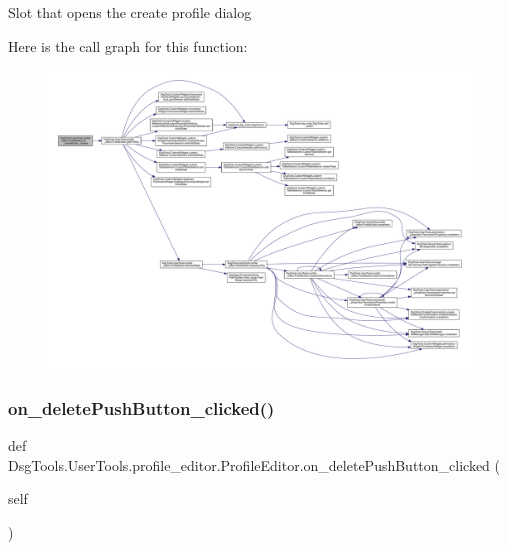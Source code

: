 \begin{DoxyVerb}Slot that opens the create profile dialog
\end{DoxyVerb}
 Here is the call graph for this function\+:
\nopagebreak
\begin{figure}[H]
\begin{center}
\leavevmode
\includegraphics[width=350pt]{class_dsg_tools_1_1_user_tools_1_1profile__editor_1_1_profile_editor_a42c11c275b6677c56a5c1dd42e553890_cgraph}
\end{center}
\end{figure}
\mbox{\label{class_dsg_tools_1_1_user_tools_1_1profile__editor_1_1_profile_editor_a42cac187ac72a40e3e81c7ced772ff93}} 
\subsubsection{\texorpdfstring{on\+\_\+delete\+Push\+Button\+\_\+clicked()}{on\_deletePushButton\_clicked()}}
{\footnotesize\ttfamily def Dsg\+Tools.\+User\+Tools.\+profile\+\_\+editor.\+Profile\+Editor.\+on\+\_\+delete\+Push\+Button\+\_\+clicked (\begin{DoxyParamCaption}\item[{}]{self }\end{DoxyParamCaption})}

